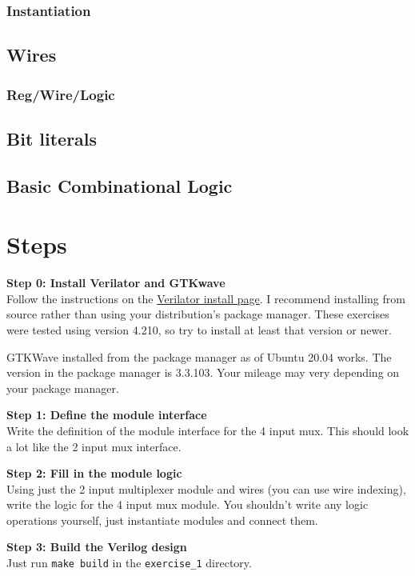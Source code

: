 \documentclass{article}
\begin{document}
\subsubsection*{Instantiation}
\subsection*{Wires}
\subsubsection*{Reg/Wire/Logic}
\subsection*{Bit literals}
\subsection*{Basic Combinational Logic}

\section*{Steps}
\textbf{Step 0: Install Verilator and GTKwave}\\
Follow the instructions on the
\hyperlink{https://veripool.org/guide/latest/install.html}{Verilator install
page}. I recommend installing from source rather than using your distribution's
package manager. These exercises were tested using version 4.210, so try to
install at least that version or newer.

GTKWave installed from the package manager as of Ubuntu 20.04 works. The version
in the package manager is 3.3.103. Your mileage may very depending on your
package manager.

\noindent\textbf{Step 1: Define the module interface}\\
Write the definition of the module interface for the 4 input mux. This should
look a lot like the 2 input mux interface.


\noindent\textbf{Step 2: Fill in the module logic}\\
Using just the 2 input multiplexer module and wires (you can use wire indexing),
write the logic for the 4 input mux module. You shouldn't write any
logic operations yourself, just instantiate modules and connect them.

\noindent\textbf{Step 3: Build the Verilog design}\\
Just run \texttt{make build} in the \texttt{exercise\_1} directory.
\end{document}
